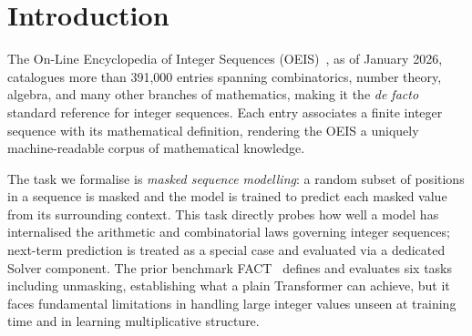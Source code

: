 
\section{Introduction}
\label{sec:introduction}

The On-Line Encyclopedia of Integer Sequences (OEIS)~\cite{sloane1996}, as of January 2026,
catalogues more than 391,000 entries spanning combinatorics, number theory, algebra, and many
other branches of mathematics, making it the \emph{de facto} standard reference for integer
sequences. Each entry associates a finite integer sequence with its mathematical definition,
rendering the OEIS a uniquely machine-readable corpus of mathematical knowledge.

The task we formalise is \emph{masked sequence modelling}: a random subset of positions in a
sequence is masked and the model is trained to predict each masked value from its surrounding
context. This task directly probes how well a model has internalised the arithmetic and
combinatorial laws governing integer sequences; next-term prediction is treated as a special
case and evaluated via a dedicated Solver component. The prior benchmark FACT~\cite{zurich-fact}
defines and evaluates six tasks including unmasking, establishing what a plain Transformer can
achieve, but it faces fundamental limitations in handling large integer values unseen at training
time and in learning multiplicative structure.

